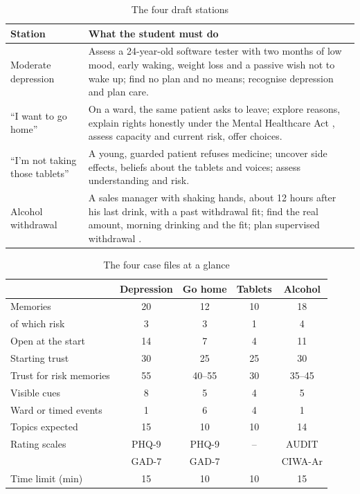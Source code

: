 \documentclass[10pt]{article}
\begin{document}
\begin{table}[htbp]
\caption{The four draft stations}
\label{p4:tab:stations}
\centering
\scriptsize
\begin{tabularx}{\linewidth}{@{}lY@{}}
\toprule
Station & What the student must do\\
\midrule
Moderate depression & Assess a 24-year-old software tester with two months of low mood, early waking, weight loss and a passive wish not to wake up; find no
plan and no means; recognise depression and plan care.\\
``I want to go home'' & On a ward, the same patient asks to leave; explore reasons, explain rights honestly under the Mental Healthcare Act
\cite{mhca2017}, assess capacity and current risk, offer choices.\\
``I'm not taking those tablets'' & A young, guarded patient refuses medicine; uncover side effects, beliefs about the tablets and voices; assess
understanding and risk.\\
Alcohol withdrawal & A sales manager with shaking hands, about 12 hours after his last drink, with a past withdrawal fit; find the real amount, morning
drinking and the fit; plan supervised withdrawal \cite{nice2010cg100}.\\
\bottomrule
\end{tabularx}
\end{table}

\begin{table}[htbp]
\caption{The four case files at a glance}
\label{p4:tab:casestats}
\centering
\scriptsize
\setlength{\tabcolsep}{2.5pt}
\begin{tabular}{@{}lcccc@{}}
\toprule
& Depression & Go home & Tablets & Alcohol\\
\midrule
Memories & 20 & 12 & 10 & 18\\
\quad of which risk & 3 & 3 & 1 & 4\\
Open at the start & 14 & 7 & 4 & 11\\
Starting trust & 30 & 25 & 25 & 30\\
Trust for risk memories & 55 & 40--55 & 30 & 35--45\\
Visible cues & 8 & 5 & 4 & 5\\
Ward or timed events & 1 & 6 & 4 & 1\\
Topics expected & 15 & 10 & 10 & 14\\
Rating scales & PHQ-9 & PHQ-9 & -- & AUDIT\\
& GAD-7 & GAD-7 & & CIWA-Ar\\
Time limit (min) & 15 & 10 & 10 & 15\\
\bottomrule
\end{tabular}
\end{table}
\end{document}
